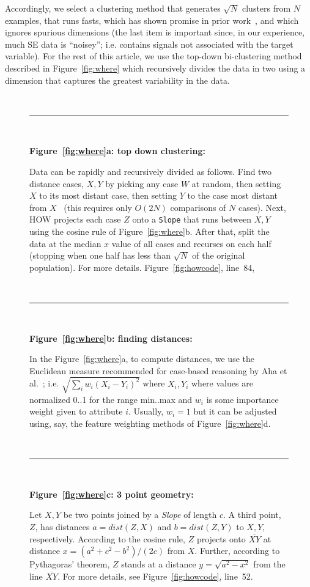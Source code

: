 \documentclass[conference]{IEEEtran}
\newcommand{\fig}[1]{Figure~\ref{fig:#1}}
\begin{document}
Accordingly, we select a clustering method that generates $\sqrt{N}$ clusters
from $N$ examples, that runs fasts, which has shown promise in prior work~\cite{Menzies2013}, and which ignores spurious dimensions (the last item is important since, in our experience, much SE data is ``noisey''; i.e. contains signals not associated with the target variable). For the rest of this article,
we use  the top-down
 bi-clustering method described in \fig{where} which recursively divides the
   data in two  using a dimension that captures the greatest variability in the data. 
\begin{figure}[t]
    \small
    ~\hrule~
    
    {\bf \fig{where}a: top down clustering:}
    
    Data can be rapidly and recursively divided   as follows.
    Find   two   distance cases,  $X,Y$
    by picking any case $W$ at random, then setting $X$ to its most
    distant case, then setting $Y$ to the case most distant from
    $X$~\cite{fastmap}
    (this requires only $O(2N)$ comparisons
    of $N$ cases).
    Next, HOW projects each case $Z$
    onto a {\tt Slope} that  runs between $X,Y$ using the cosine
    rule of \fig{where}b. After that,  split the data at the median $x$ value of all cases and
    recurses on each half  (stopping when
    one half has less  than $\sqrt{N}$ of the original population). For more details. \fig{howcode}, line~84, 
    
    ~\hrule~
    
    {\bf \fig{where}b: finding distances:}
    
    In the \fig{where}a, to compute distances, we use
    the Euclidean measure recommended for
    case-based reasoning by Aha et al.~\cite{aha91};
    i.e. $\sqrt{\sum_iw_i(X_i-Y_i)^2}$ where $X_i,Y_i$
    where values are  normalized 0..1 for the range min..max and 
    $w_i$ is some importance weight given to attribute $i$.
    Usually, $w_i=1$ but it can be adjusted using, say,
    the feature weighting methods of \fig{where}d. 
    
    ~\hrule~
    
    {\bf \fig{where}c: 3 point geometry:}
    
    Let   $X,Y$ be two points joined by  a {\em Slope} of  length $c$.
    A third point, $Z$, has distances  $a=dist(Z,X)$ and
    $b=dist(Z,Y)$ to $X,Y$, respectively.
    According to the cosine rule,   $Z$ projects onto  $\overline{XY}$
    at distance $x=(a^2 + c^2 - b^2)/(2c)$ from $X$.
    Further, according to Pythagoras' theorem, $Z$ stands at a distance
    $y = \sqrt{a^2 - x^2}$ from the line $\overline{XY}$. For more details, see  \fig{howcode}, line~52.
    

\end{figure}
\end{document}
